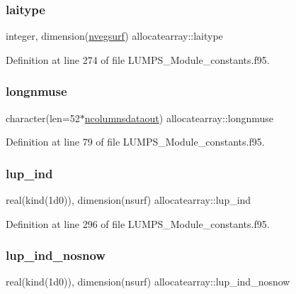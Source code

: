 \subsubsection{\texorpdfstring{laitype}{laitype}}
{\footnotesize\ttfamily integer, dimension(\hyperlink{namespaceallocatearray_abb987c3b35dd321963fd53d38f10236f}{nvegsurf}) allocatearray\+::laitype}



Definition at line 274 of file L\+U\+M\+P\+S\+\_\+\+Module\+\_\+constants.\+f95.

\mbox{\label{namespaceallocatearray_a3f68661e372f6193bcfd35d4e245b3bb}} 
\subsubsection{\texorpdfstring{longnmuse}{longnmuse}}
{\footnotesize\ttfamily character(len=52$\ast$\hyperlink{namespaceallocatearray_a9408900bed6c87ed095d2c688c1506a0}{ncolumnsdataout}) allocatearray\+::longnmuse}



Definition at line 79 of file L\+U\+M\+P\+S\+\_\+\+Module\+\_\+constants.\+f95.

\mbox{\label{namespaceallocatearray_abe02f0b83f99a74be1c1133b86872599}} 
\subsubsection{\texorpdfstring{lup\+\_\+ind}{lup\_ind}}
{\footnotesize\ttfamily real(kind(1d0)), dimension(nsurf) allocatearray\+::lup\+\_\+ind}



Definition at line 296 of file L\+U\+M\+P\+S\+\_\+\+Module\+\_\+constants.\+f95.

\mbox{\label{namespaceallocatearray_a99b72c6fb88f3204dc332f38601a92fb}} 
\subsubsection{\texorpdfstring{lup\+\_\+ind\+\_\+nosnow}{lup\_ind\_nosnow}}
{\footnotesize\ttfamily real(kind(1d0)), dimension(nsurf) allocatearray\+::lup\+\_\+ind\+\_\+nosnow}



